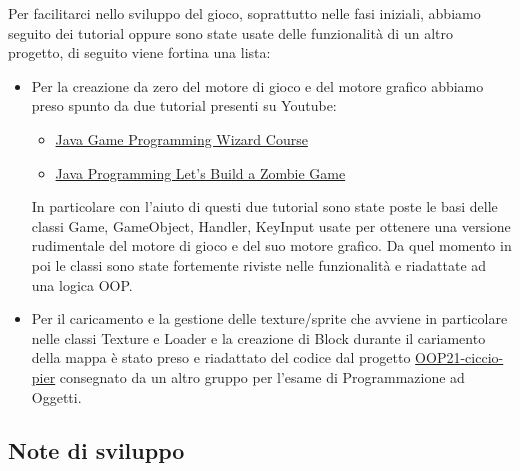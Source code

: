 \documentclass[a4paper,12pt]{report}
\begin{document}
Per facilitarci nello sviluppo del gioco, soprattutto nelle fasi iniziali, abbiamo seguito dei tutorial oppure sono state usate delle funzionalità di un altro progetto, di seguito viene fortina una lista:
\begin{itemize}
	\item Per la creazione da zero del motore di gioco e del motore grafico abbiamo preso spunto da due tutorial presenti su Youtube: 
	 \begin{itemize}
	 	\item \href{https://www.youtube.com/playlist?list=PLWms45O3n--5vDnNd6aiu1CSWX3JlCU1n}{Java Game Programming Wizard Course}
	 	\item \href{https://www.youtube.com/playlist?list=PLWms45O3n--5vv69_AlMw23O1Z31CaW1F}{Java Programming Let's Build a Zombie Game}
	 \end{itemize}
	 In particolare con l'aiuto di questi due tutorial sono state poste le basi delle classi Game, GameObject, Handler, KeyInput usate per ottenere una versione rudimentale del motore di gioco e del suo motore grafico.
	 Da quel momento in poi le classi sono state fortemente riviste nelle funzionalità e riadattate ad una logica OOP.
	 
	 \item Per il caricamento e la gestione delle texture/sprite che avviene in particolare nelle classi Texture e Loader e la creazione di Block durante il cariamento della mappa è stato preso e riadattato del codice dal progetto 
	 \href{https://github.com/Valdi1111/OOP21-ciccio-pier}{OOP21-ciccio-pier} consegnato da un altro gruppo per l'esame di Programmazione ad Oggetti.
	 
\end{itemize}

\paragraph{}

\subsection{Note di sviluppo}
\end{document}
